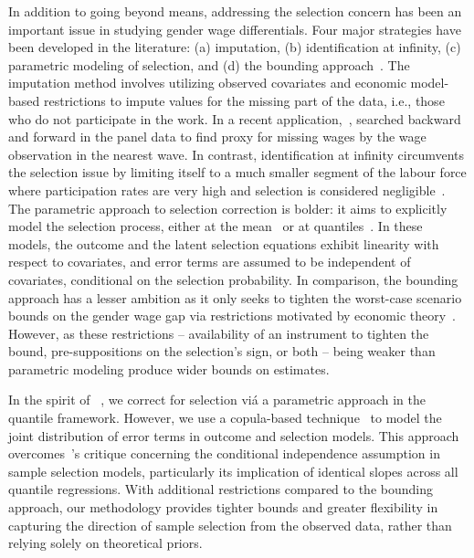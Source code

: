In addition to going beyond means, addressing the selection concern has been an important issue in studying gender wage differentials. Four major strategies have been developed in the literature: (a) imputation, (b) identification at infinity, (c) parametric modeling of selection, and (d) the bounding approach~\citep{Machado2017}. The imputation method involves utilizing observed covariates and economic model-based restrictions to impute values for the missing part of the data, i.e., those who do not participate in the work. In a recent application,~\citet{Blau2021}, searched backward and forward in the panel data to find proxy for missing wages by the wage observation in the nearest wave. In contrast, identification at infinity circumvents the selection issue by limiting itself to a much smaller segment of the labour force where participation rates are very high and selection is considered negligible~\citep{Machado2017,Mulligan2008,Heckman1990}. The parametric approach to selection correction is bolder: it aims to explicitly model the selection process, either at the mean~\citep{Newey2009, Heckman1979, Heckman1974} or at quantiles~\citep{Buchinsky1998}. In these models, the outcome and the latent selection equations exhibit linearity with respect to covariates, and error terms are assumed to be independent of covariates, conditional on the selection probability. In comparison, the bounding approach has a lesser ambition as it only seeks to tighten the worst-case scenario bounds on the gender wage gap via restrictions motivated by economic theory~\citep{Blundell2007}. However, as these restrictions -- availability of an instrument to tighten the bound, pre-suppositions on the selection’s sign, or both -- being weaker than parametric modeling produce wider bounds on estimates.\par

In the spirit of ~\citet{Buchinsky1998}, we correct for selection vi\'{a} a parametric approach in the quantile framework. However, we use a copula-based technique~\citep{Arellano2017} to model the joint distribution of error terms in outcome and selection models. This approach overcomes~\citet{Huber2015}'s critique concerning the conditional independence assumption in sample selection models, particularly its implication of identical slopes across all quantile regressions. With additional restrictions compared to the bounding approach, our methodology provides tighter bounds and greater flexibility in capturing the direction of sample selection from the observed data, rather than relying solely on theoretical priors.\par

